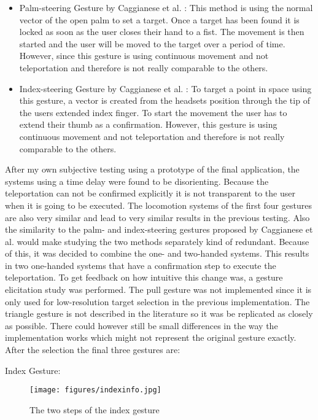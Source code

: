 \begin{itemize}
    \item Palm-steering Gesture by Caggianese et al. \cite{Caggianese}:
    This method is using the normal vector of the open palm to set a target. Once a target has been found it is locked as soon as the user closes their hand to a fist. The movement is then started and the user will be moved to the target over a period of time.
    However, since this gesture is using continuous movement and not teleportation and therefore is not really comparable to the others.
    
    \item Index-steering Gesture by Caggianese et al. \cite{Caggianese}:
    To target a point in space using this gesture, a vector is created from the headsets position through the tip of the users extended index finger. To start the movement the user has to extend their thumb as a confirmation.
    However, this gesture is using continuous movement and not teleportation and therefore is not really comparable to the others.
\end{itemize}

After my own subjective testing using a prototype of the final application, the systems using a time delay were found to be disorienting. Because the teleportation can not be confirmed explicitly it is not transparent to the user when it is going to be executed. The locomotion systems of the first four gestures are also very similar and lead to very similar results in the previous testing. Also the similarity to the palm- and index-steering gestures proposed by Caggianese et al. would make studying the two methods separately kind of redundant. Because of this, it was decided to combine the one- and two-handed systems. This results in two one-handed systems that have a confirmation step to execute the teleportation. To get feedback on how intuitive this change was, a gesture elicitation study was performed. The pull gesture was not implemented since it is only used for low-resolution target selection in the previous implementation. The triangle gesture is not described in the literature so it was be replicated as closely as possible. There could however still be small differences in the way the implementation works which might not represent the original gesture exactly. After the selection the final three gestures are:

Index Gesture: 
\begin{figure}[!ht]
    \centering
    \texttt{[image: figures/indexinfo.jpg]}
    \caption{The two steps of the index gesture}
    \label{fig:indexInfo}
\end{figure}

